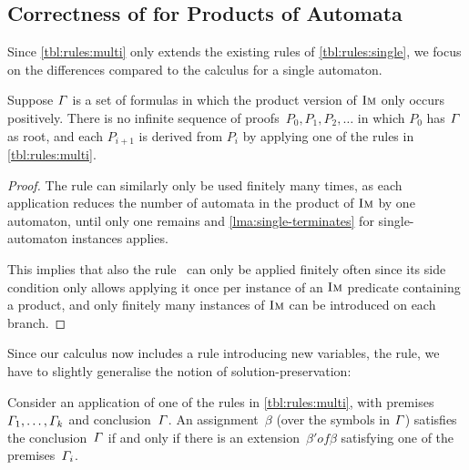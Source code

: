 \subsection{Correctness of \Calculus{} for Products of Automata}

Since \cref{tbl:rules:multi} only extends the existing rules of
\cref{tbl:rules:single}, we focus on the differences compared
to the calculus for a single automaton.

\begin{lemma}\label{lma:multi-terminates}
  Suppose $\varGamma{}$ is a set of formulas in which the product
  version of $\operatorname{\textsc{Im}}$ only occurs positively. There is no
  infinite sequence of proofs~$P_0, P_1, P_2, \ldots$ in which $P_0$
  has $\varGamma{}$ as root, and each $P_{i+1}$ is derived from
  $P_i$ by applying one of the rules in \cref{tbl:rules:multi}.
\end{lemma}

\begin{proof}
  The rule \Materialise{} can similarly only be used finitely many times, as
  each application reduces the number of automata in the product of $\operatorname{\textsc{Im}}$ by
  one automaton, until only one remains and \cref{lma:single-terminates} for
  single-automaton instances applies.
  
  This implies that also the rule~\ExpandM{} can only be applied
  finitely often since its side condition only allows applying it once
  per instance of an $\operatorname{\textsc{Im}}$ predicate containing a product, and only finitely
  many instances of $\operatorname{\textsc{Im}}$ can be introduced on each branch.
\end{proof}


Since our calculus now includes a rule introducing new variables, the
\Materialise{} rule, we have to slightly generalise the notion of
solution-preservation:
%
\begin{lemma}\label{lma:multi-correct}
  Consider an application of one of the rules in
  \cref{tbl:rules:multi}, with
  premises~$\varGamma_1, \ldots, \varGamma_k$ and
  conclusion~$\varGamma$. An assignment~$\beta$ (over the symbols in
  $\varGamma$) satisfies the conclusion~$\varGamma$ if and only if
  there is an extension~$\beta' of \beta$ satisfying one of the
  premises~$\varGamma_i$.
\end{lemma}

